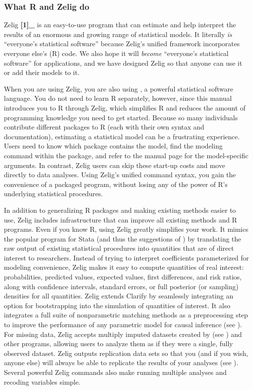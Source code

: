 \documentclass[letterpaper,10pt,english]{sphinxmanual}
\begin{document}
\subsubsection{What R and Zelig do}
\label{docs/user_guide:what-r-and-zelig-do}
Zelig {\color{red}\bfseries{}{[}1{]}\_} is an easy-to-use program that can estimate and help
interpret the results of an enormous and growing range of statistical
models. It literally \emph{is} “everyone’s statistical software” because
Zelig’s unified framework incorporates everyone else’s (R) code. We also
hope it will \emph{become} “everyone’s statistical software” for
applications, and we have designed Zelig so that anyone can use it or
add their models to it.

When you are using Zelig, you are also using , a powerful statistical
software language. You do not need to learn R separately, however, since
this manual introduces you to R through Zelig, which simplifies R and
reduces the amount of programming knowledge you need to get started.
Because so many individuals contribute different packages to R (each
with their own syntax and documentation), estimating a statistical model
can be a frustrating experience. Users need to know which package
contains the model, find the modeling command within the package, and
refer to the manual page for the model-specific arguments. In contrast,
Zelig users can skip these start-up costs and move directly to data
analyses. Using Zelig’s unified command syntax, you gain the convenience
of a packaged program, without losing any of the power of R’s underlying
statistical procedures.

In addition to generalizing R packages and making existing methods
easier to use, Zelig includes infrastructure that can improve all
existing methods and R programs. Even if you know R, using Zelig greatly
simplifies your work. It mimics the popular program for Stata (and thus
the suggestions of ) by translating the raw output of existing
statistical procedures into quantities that are of direct interest to
researchers. Instead of trying to interpret coefficients parameterized
for modeling convenience, Zelig makes it easy to compute quantities of
real interest: probabilities, predicted values, expected values, first
differences, and risk ratios, along with confidence intervals, standard
errors, or full posterior (or sampling) densities for all quantities.
Zelig extends Clarify by seamlessly integrating an option for
bootstrapping into the simulation of quantities of interest. It also
integrates a full suite of nonparametric matching methods as a
preprocessing step to improve the performance of any parametric model
for causal inference (see ). For missing data, Zelig accepts multiply
imputed datasets created by (see ) and other programs, allowing users to
analyze them as if they were a single, fully observed dataset. Zelig
outputs replication data sets so that you (and if you wish, anyone else)
will always be able to replicate the results of your analyses (see ).
Several powerful Zelig commands also make running multiple analyses and
recoding variables simple.
\end{document}
